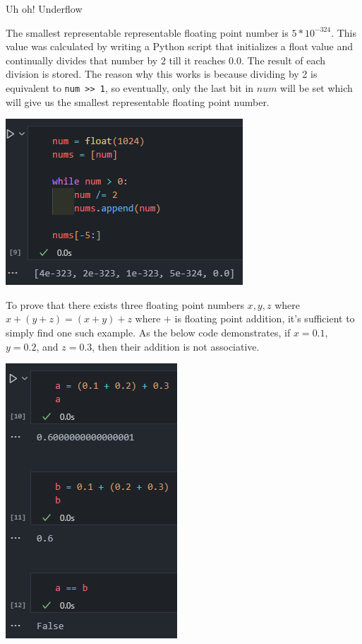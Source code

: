 \documentclass[11pt, nopagenumbers]{adamblan-hw}
\begin{document}
\begin{question}{Uh oh! Underflow}

\begin{part}
The smallest representable representable floating point number is $5 * 10^{-324}$.
This value was calculated by writing a Python script that initializes a float value
and continually divides that number by $2$ till it reaches  $0.0$. The result of 
each division is stored. The reason why this works is because dividing by 2 is equivalent
to \texttt{num >> 1}, so eventually, only the last bit in $num$ will be set which will give
us the smallest representable floating point number.

\includegraphics{1a.png}

\end{part}

\pagebreak
\begin{part} 
To prove that there exists three floating point numbers $x, y, z$ where
$x + (y + z) = (x + y) + z$ where $+$ is floating point addition, it's sufficient
to simply find one such example. As the below code demonstrates, if $x = 0.1$, 
$y = 0.2$, and $z = 0.3$, then their addition is not associative.

\includegraphics{1b.png}
\end{part}


\end{question}
\end{document}
